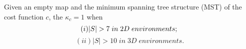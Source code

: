 %
%

\begin{theorem} 
Given an empty map and the minimum spanning tree structure (MST) of the cost function $c$, the $\kappa_c = 1$ when\\
\begin{equation}
(i) |S| > 7\; in\; 2D\; environments; \\
\label{eq:2D}
\end{equation}
\begin{equation}
(ii) |S| > 10\; in\; 3D\; environments.
\label{eq:3D}
\end{equation}
\label{thm:mst}
\end{theorem}

